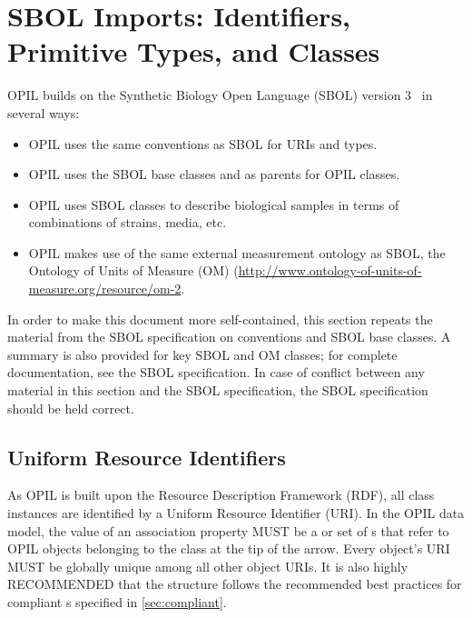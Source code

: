 \section{SBOL Imports: Identifiers, Primitive Types, and Classes}

OPIL builds on the Synthetic Biology Open Language (SBOL) version 3~\citep{SBOL3} in several ways:
\begin{itemize}
\item OPIL uses the same conventions as SBOL for URIs and types.
\item OPIL uses the SBOL base classes  and  as parents for OPIL classes.
\item OPIL uses SBOL classes to describe biological samples in terms of combinations of strains, media, etc.
\item OPIL makes use of the same external measurement ontology as SBOL, the Ontology of Units of Measure (OM) (\url{http://www.ontology-of-units-of-measure.org/resource/om-2}.
\end{itemize}

In order to make this document more self-contained, this section repeats the material from the SBOL specification on conventions and SBOL base classes.
A summary is also provided for key SBOL and OM classes; for complete documentation, see the SBOL specification.
In case of conflict between any material in this section and the SBOL specification, the SBOL specification should be held correct.

\subsection{Uniform Resource Identifiers}
\label{sec:URIstructure}

As OPIL is built upon the Resource Description Framework (RDF), all class instances are identified by a Uniform Resource Identifier (URI).  In the OPIL data model, the value of an association property MUST be a  or set of s that refer to OPIL objects belonging to the class at the tip of the arrow.  Every  object's URI MUST be globally unique among all other  object URIs. It is also highly RECOMMENDED that the  structure follows the recommended best practices for compliant s specified in \ref{sec:compliant}.

